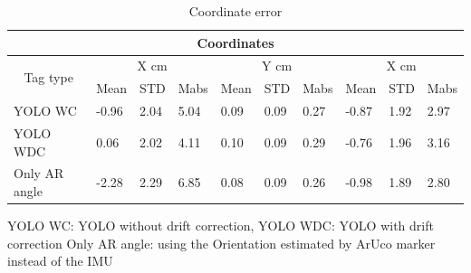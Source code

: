 \documentclass[12pt, twoside]{report}
\begin{document}
\begin{table}[]
    \centering
    \begin{tabular}{|llllllllll|}
        \hline
        \multicolumn{10}{|c|}{Coordinates}                                                                                                                                                                                                                                                       \\ \hline
        \multicolumn{1}{|c|}{\multirow{2}{*}{Tag type}} & \multicolumn{3}{c|}{X cm}  & \multicolumn{3}{c|}{Y cm} & \multicolumn{3}{c|}{X cm}                                                                                                                                                     \\ \cline{2-10}
        \multicolumn{1}{|c|}{}                          & \multicolumn{1}{l|}{Mean}  & \multicolumn{1}{l|}{STD}  & \multicolumn{1}{l|}{Mabs} & \multicolumn{1}{l|}{Mean} & \multicolumn{1}{l|}{STD}  & \multicolumn{1}{l|}{Mabs} & \multicolumn{1}{l|}{Mean}  & \multicolumn{1}{l|}{STD}  & Mabs \\ \hline
        \multicolumn{1}{|l|}{YOLO WC}                   & \multicolumn{1}{l|}{-0.96} & \multicolumn{1}{l|}{2.04} & \multicolumn{1}{l|}{5.04} & \multicolumn{1}{l|}{0.09} & \multicolumn{1}{l|}{0.09} & \multicolumn{1}{l|}{0.27} & \multicolumn{1}{l|}{-0.87} & \multicolumn{1}{l|}{1.92} & 2.97 \\ \hline
        \multicolumn{1}{|l|}{YOLO WDC}                  & \multicolumn{1}{l|}{0.06}  & \multicolumn{1}{l|}{2.02} & \multicolumn{1}{l|}{4.11} & \multicolumn{1}{l|}{0.10} & \multicolumn{1}{l|}{0.09} & \multicolumn{1}{l|}{0.29} & \multicolumn{1}{l|}{-0.76} & \multicolumn{1}{l|}{1.96} & 3.16 \\ \hline
        \multicolumn{1}{|l|}{Only AR angle}             & \multicolumn{1}{l|}{-2.28} & \multicolumn{1}{l|}{2.29} & \multicolumn{1}{l|}{6.85} & \multicolumn{1}{l|}{0.08} & \multicolumn{1}{l|}{0.09} & \multicolumn{1}{l|}{0.26} & \multicolumn{1}{l|}{-0.98} & \multicolumn{1}{l|}{1.89} & 2.80 \\ \hline
    \end{tabular}
    \caption{Coordinate error}
    {YOLO WC: YOLO without drift correction, YOLO WDC: YOLO with drift correction
        Only AR angle: using the Orientation estimated by ArUco marker instead of the IMU}
    \label{tab:three_marker_accuracy}

\end{table}
\end{document}
